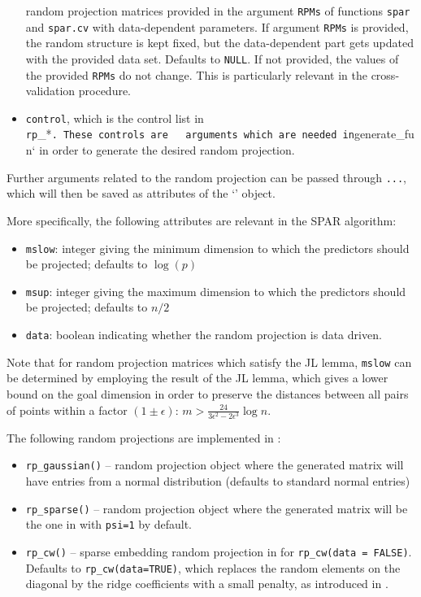 \documentclass[
  article]{jss}
\newcommand{\class}[1]{`\code{#1}'}
\begin{document}
\begin{itemize}
  random projection matrices provided in the argument \texttt{RPMs} of
  functions \texttt{spar} and \texttt{spar.cv} with data-dependent
  parameters. If argument \texttt{RPMs} is provided, the random
  structure is kept fixed, but the data-dependent part gets updated with
  the provided data set. Defaults to \texttt{NULL}. If not provided, the
  values of the provided \texttt{RPMs} do not change. This is
  particularly relevant in the cross-validation procedure.
\item
  \texttt{control}, which is the control list in
  \texttt{rp}\_*\texttt{.\ These\ controls\ are\ \ \ arguments\ which\ are\ needed\ in}generate\_fun`
  in order to generate the desired random projection.
\end{itemize}

Further arguments related to the random projection can be passed through
\texttt{...}, which will then be saved as attributes of the
\class{randomprojection} object.

More specifically, the following attributes are relevant in the SPAR
algorithm:

\begin{itemize}
\item
  \texttt{mslow}: integer giving the minimum dimension to which the
  predictors should be projected; defaults to \(\log(p)\)
\item
  \texttt{msup}: integer giving the maximum dimension to which the
  predictors should be projected; defaults to \(n/2\)
\item
  \texttt{data}: boolean indicating whether the random projection is
  data driven.
\end{itemize}

Note that for random projection matrices which satisfy the JL lemma,
\texttt{mslow} can be determined by employing the result of the JL
lemma, which gives a lower bound on the goal dimension in order to
preserve the distances between all pairs of points within a factor
\((1 \pm \epsilon)\): \(m>\frac{24}{3\epsilon^2-2\epsilon^3}\log n\).

The following random projections are implemented in :

\begin{itemize}
\item
  \texttt{rp\_gaussian()} -- random projection object where the
  generated matrix will have entries from a normal distribution
  (defaults to standard normal entries)
\item
  \texttt{rp\_sparse()} -- random projection object where the generated
  matrix will be the one in \citep{ACHLIOPTAS2003JL} with \texttt{psi=1}
  by default.
\item
  \texttt{rp\_cw()} -- sparse embedding random projection in
  \citep{Clarkson2013LowRankApprox} for \texttt{rp\_cw(data\ =\ FALSE)}.
  Defaults to \texttt{rp\_cw(data=TRUE)}, which replaces the random
  elements on the diagonal by the ridge coefficients with a small
  penalty, as introduced in \citet{parzer2024glms}.
\end{itemize}
\end{document}
